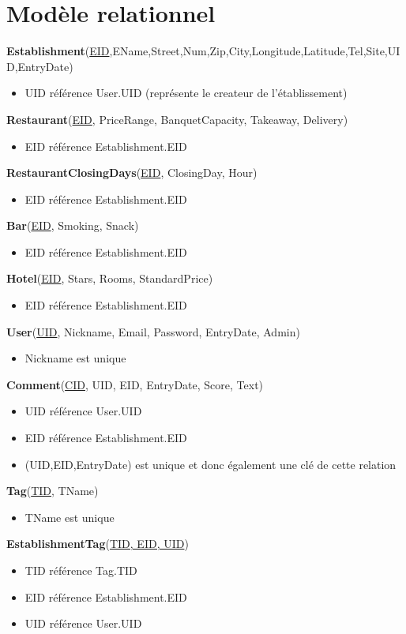 \documentclass[11pt,a4paper]{report}
\begin{document}
\section*{Modèle relationnel}
\noindent
\textbf{Establishment}(\underline{EID},EName,Street,Num,Zip,City,Longitude,Latitude,Tel,Site,UID,EntryDate)
\begin{itemize}
\item UID référence User.UID (représente le createur de l'établissement)\\
\end{itemize}
\textbf{Restaurant}(\underline{EID}, PriceRange, BanquetCapacity, Takeaway, Delivery)
\begin{itemize}
\item EID référence Establishment.EID\\
\end{itemize} 
\textbf{RestaurantClosingDays}(\underline{EID}, ClosingDay, Hour)
\begin{itemize}
\item EID référence Establishment.EID\\
\end{itemize}
\textbf{Bar}(\underline{EID}, Smoking, Snack)
\begin{itemize}
\item EID référence Establishment.EID\\
\end{itemize}
\textbf{Hotel}(\underline{EID}, Stars, Rooms, StandardPrice)
\begin{itemize}
\item EID référence Establishment.EID\\
\end{itemize}
\textbf{User}(\underline{UID}, Nickname, Email, Password, EntryDate, Admin)
\begin{itemize}
\item Nickname est unique\\
\end{itemize}
\textbf{Comment}(\underline{CID}, UID, EID, EntryDate, Score,  Text)
\begin{itemize}
\item UID référence User.UID
\item EID référence Establishment.EID
\item (UID,EID,EntryDate) est unique et donc également une clé de cette relation\\
\end{itemize}
\textbf{Tag}(\underline{TID}, TName)
\begin{itemize}
\item TName est unique\\
\end{itemize}
\textbf{EstablishmentTag}(\underline{TID, EID, UID})
\begin{itemize}
\item TID référence Tag.TID
\item EID référence Establishment.EID
\item UID référence User.UID\\
\end{itemize}
\end{document}
